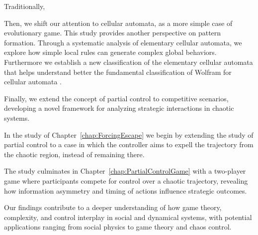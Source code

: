 Traditionally, %



Then, we shift our attention to cellular automata, as a more simple case of evolutionary game. This study provides another perspective on pattern formation. Through a systematic analysis of elementary cellular automata, we explore how simple local rules can generate complex global behaviors. Furthermore we establish a new classification of the elementary cellular automata that helps understand better the fundamental classification of Wolfram for cellular automata \cite{WolframClass}.





Finally, we extend the concept of partial control to competitive scenarios, developing a novel framework for analyzing strategic interactions in chaotic systems. 


In the study of Chapter~\ref{chap:ForcingEscape} we begin by extending the study of partial control to a case in which the controller aims to expell the trajectory from the chaotic region, instead of remaining there. %

The study culminates in Chapter~\ref{chap:PartialControlGame} with a two-player game where participants compete for control over a chaotic trajectory, revealing how information asymmetry and timing of actions influence strategic outcomes.



Our findings contribute to a deeper understanding of how game theory, complexity, and control interplay in social and dynamical systems, with potential applications ranging from social physics to game theory and chaos control.










\begin{thebibliography}{01}





\end{thebibliography}

